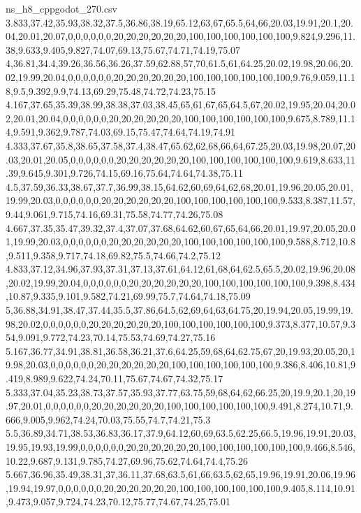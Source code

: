 \begin{filecontents*}[overwrite]{ns_h8_cppgodot_270.csv}
3.833,37.42,35.93,38.32,37.5,36.86,38.19,65.12,63,67,65.5,64,66,20.03,19.91,20.1,20.04,20.01,20.07,0,0,0,0,0,0,20,20,20,20,20,20,100,100,100,100,100,100,9.824,9.296,11.38,9.633,9.405,9.827,74.07,69.13,75.67,74.71,74.19,75.07
4,36.81,34.4,39.26,36.56,36.26,37.59,62.88,57,70,61.5,61,64.25,20.02,19.98,20.06,20.02,19.99,20.04,0,0,0,0,0,0,20,20,20,20,20,20,100,100,100,100,100,100,9.76,9.059,11.18,9.5,9.392,9.9,74.13,69.29,75.48,74.72,74.23,75.15
4.167,37.65,35.39,38.99,38.38,37.03,38.45,65,61,67,65,64.5,67,20.02,19.95,20.04,20.02,20.01,20.04,0,0,0,0,0,0,20,20,20,20,20,20,100,100,100,100,100,100,9.675,8.789,11.14,9.591,9.362,9.787,74.03,69.15,75.47,74.64,74.19,74.91
4.333,37.67,35.8,38.65,37.58,37.4,38.47,65.62,62,68,66,64,67.25,20.03,19.98,20.07,20.03,20.01,20.05,0,0,0,0,0,0,20,20,20,20,20,20,100,100,100,100,100,100,9.619,8.633,11.39,9.645,9.301,9.726,74.15,69.16,75.64,74.64,74.38,75.11
4.5,37.59,36.33,38.67,37.7,36.99,38.15,64.62,60,69,64,62,68,20.01,19.96,20.05,20.01,19.99,20.03,0,0,0,0,0,0,20,20,20,20,20,20,100,100,100,100,100,100,9.533,8.387,11.57,9.44,9.061,9.715,74.16,69.31,75.58,74.77,74.26,75.08
4.667,37.35,35.47,39.32,37.4,37.07,37.68,64.62,60,67,65,64,66,20.01,19.97,20.05,20.01,19.99,20.03,0,0,0,0,0,0,20,20,20,20,20,20,100,100,100,100,100,100,9.588,8.712,10.8,9.511,9.358,9.717,74.18,69.82,75.5,74.66,74.2,75.12
4.833,37.12,34.96,37.93,37.31,37.13,37.61,64.12,61,68,64,62.5,65.5,20.02,19.96,20.08,20.02,19.99,20.04,0,0,0,0,0,0,20,20,20,20,20,20,100,100,100,100,100,100,9.398,8.434,10.87,9.335,9.101,9.582,74.21,69.99,75.7,74.64,74.18,75.09
5,36.88,34.91,38.47,37.44,35.5,37.86,64.5,62,69,64,63,64.75,20,19.94,20.05,19.99,19.98,20.02,0,0,0,0,0,0,20,20,20,20,20,20,100,100,100,100,100,100,9.373,8.377,10.57,9.354,9.091,9.772,74.23,70.14,75.53,74.69,74.27,75.16
5.167,36.77,34.91,38.81,36.58,36.21,37.6,64.25,59,68,64,62.75,67,20,19.93,20.05,20,19.98,20.03,0,0,0,0,0,0,20,20,20,20,20,20,100,100,100,100,100,100,9.386,8.406,10.81,9.419,8.989,9.622,74.24,70.11,75.67,74.67,74.32,75.17
5.333,37.04,35.23,38.73,37.57,35.93,37.77,63.75,59,68,64,62,66.25,20,19.9,20.1,20,19.97,20.01,0,0,0,0,0,0,20,20,20,20,20,20,100,100,100,100,100,100,9.491,8.274,10.71,9.666,9.005,9.962,74.24,70.03,75.55,74.7,74.21,75.3
5.5,36.89,34.71,38.53,36.83,36.17,37.9,64.12,60,69,63.5,62.25,66.5,19.96,19.91,20.03,19.95,19.93,19.99,0,0,0,0,0,0,20,20,20,20,20,20,100,100,100,100,100,100,9.466,8.546,10.22,9.687,9.131,9.785,74.27,69.96,75.62,74.64,74.4,75.26
5.667,36.96,35.49,38.31,37,36.11,37.68,63.5,61,66,63.5,62,65,19.96,19.91,20.06,19.96,19.94,19.97,0,0,0,0,0,0,20,20,20,20,20,20,100,100,100,100,100,100,9.405,8.114,10.91,9.473,9.057,9.724,74.23,70.12,75.77,74.67,74.25,75.01

\end{filecontents*}
